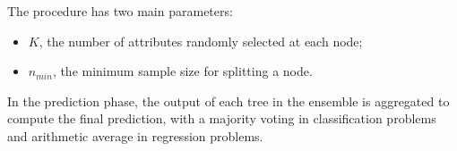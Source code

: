 The procedure has two main parameters: 
\begin{itemize}
    \item $K$, the number of attributes randomly selected at each node;
    \item $n_{min}$, the minimum sample size for splitting a node. 
\end{itemize}
In the prediction phase, the output of each tree in the ensemble is aggregated
to compute the final prediction, with a majority voting in classification 
problems and arithmetic average in regression problems.




























